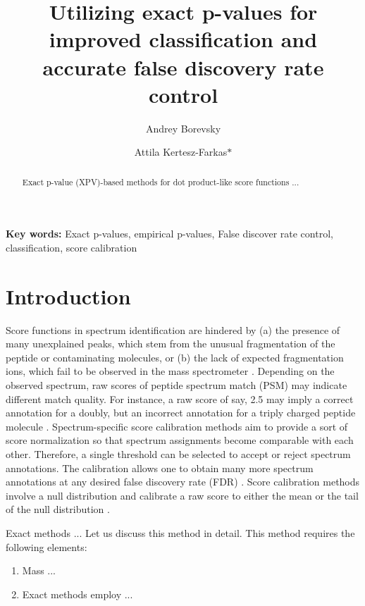 \documentclass[journal=jpr,manuscript=article]{achemso}
\author{Andrey Borevsky}
\author{Attila Kertesz-Farkas$\ast$}
\affiliation{Laboratory on AI for Computational Biology, Faculty of Computer Science, HSE University,  11 Pokrovsky Bvld., Moscow 109028, Russian Federation}
\title{Utilizing exact p-values for improved classification and accurate false discovery rate control}
\begin{document}
\maketitle

\begin{abstract}
Exact p-value (XPV)-based methods for dot product-like score functions ...


\end{abstract}
\textbf{Key words:} Exact p-values, empirical p-values, False discover rate control, classification, score calibration
\section{Introduction}

Score functions in spectrum identification \cite{aebersold2003mass,kertesz2012database,kudriavtseva2021deep,sulimov2020annotation,noble2012computational} are hindered by (a) the presence of many unexplained peaks, which stem from the unusual fragmentation of the peptide or contaminating molecules, or (b) the lack of expected fragmentation ions, which fail to be observed in the mass spectrometer \cite{noble2012computational}. Depending on the observed spectrum, raw scores of peptide spectrum match (PSM) may indicate different match quality. For instance, a raw score of  say, 2.5 may imply a correct annotation for a doubly, but an incorrect annotation for a triply charged peptide molecule \cite{keich2014importance}. Spectrum-specific score calibration methods aim to provide a sort of score normalization so that spectrum assignments become comparable with each other. Therefore, a single threshold can be selected to accept or reject spectrum annotations. The calibration allows one to obtain many more spectrum annotations at any desired false discovery rate (FDR) \cite{keich2014importance}. Score calibration methods involve a null distribution and calibrate a raw score to either the mean or the tail of the null distribution \cite{sadygov2003hypergeometric, spirin2011assigning, sulimov2019tailor, fenyo2003method, kim2008spectral, kim2010generating, kim2014ms, alves2010raid_aps}.

Exact methods ... 
Let us discuss this method in detail. This method requires the following elements:
\begin{enumerate}
	\itemsep-3pt  		
	\item Mass ...
	
	\item Exact methods employ ...
\end{enumerate}
\end{document}

